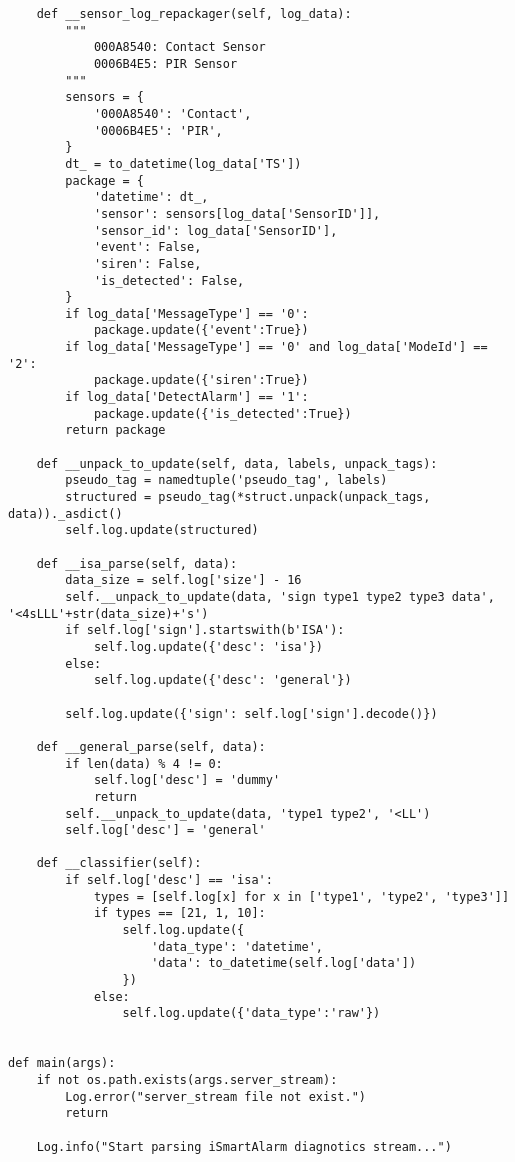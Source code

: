 \documentclass{easychair}
\begin{document}
\begin{lstlisting}
    def __sensor_log_repackager(self, log_data):
        """
            000A8540: Contact Sensor
            0006B4E5: PIR Sensor
        """
        sensors = {
            '000A8540': 'Contact',
            '0006B4E5': 'PIR',
        }
        dt_ = to_datetime(log_data['TS'])
        package = {
            'datetime': dt_,
            'sensor': sensors[log_data['SensorID']],
            'sensor_id': log_data['SensorID'],
            'event': False,
            'siren': False,
            'is_detected': False,
        }
        if log_data['MessageType'] == '0':
            package.update({'event':True})
        if log_data['MessageType'] == '0' and log_data['ModeId'] == '2':
            package.update({'siren':True})
        if log_data['DetectAlarm'] == '1':
            package.update({'is_detected':True})
        return package

    def __unpack_to_update(self, data, labels, unpack_tags):
        pseudo_tag = namedtuple('pseudo_tag', labels)
        structured = pseudo_tag(*struct.unpack(unpack_tags, data))._asdict()
        self.log.update(structured)

    def __isa_parse(self, data):
        data_size = self.log['size'] - 16
        self.__unpack_to_update(data, 'sign type1 type2 type3 data', '<4sLLL'+str(data_size)+'s')
        if self.log['sign'].startswith(b'ISA'):
            self.log.update({'desc': 'isa'})
        else:
            self.log.update({'desc': 'general'})

        self.log.update({'sign': self.log['sign'].decode()})

    def __general_parse(self, data):
        if len(data) % 4 != 0:
            self.log['desc'] = 'dummy'
            return
        self.__unpack_to_update(data, 'type1 type2', '<LL')
        self.log['desc'] = 'general'

    def __classifier(self):
        if self.log['desc'] == 'isa':
            types = [self.log[x] for x in ['type1', 'type2', 'type3']]
            if types == [21, 1, 10]:
                self.log.update({
                    'data_type': 'datetime',
                    'data': to_datetime(self.log['data'])
                })
            else:
                self.log.update({'data_type':'raw'})


def main(args):
    if not os.path.exists(args.server_stream):
        Log.error("server_stream file not exist.")
        return

    Log.info("Start parsing iSmartAlarm diagnotics stream...")


\end{lstlisting}
\end{document}
